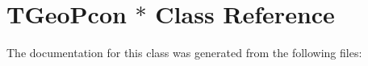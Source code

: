 \hypertarget{class_t_geo_pcon_01_5}{
\section{TGeoPcon $\ast$ Class Reference}
\label{class_t_geo_pcon_01_5}
}


The documentation for this class was generated from the following files: